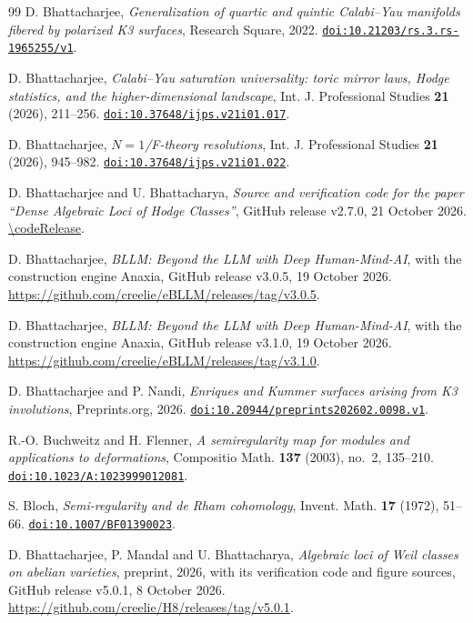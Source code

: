 \begin{thebibliography}{99}
D. Bhattacharjee,
\emph{Generalization of quartic and quintic Calabi--Yau manifolds fibered by polarized K3 surfaces},
Research Square, 2022.
\href{https://doi.org/10.21203/rs.3.rs-1965255/v1}{\nolinkurl{doi:10.21203/rs.3.rs-1965255/v1}}.

D. Bhattacharjee,
\emph{Calabi--Yau saturation universality: toric mirror laws, Hodge statistics, and the higher-dimensional landscape},
Int. J. Professional Studies \textbf{21} (2026), 211--256.
\href{https://doi.org/10.37648/ijps.v21i01.017}{\nolinkurl{doi:10.37648/ijps.v21i01.017}}.

D. Bhattacharjee,
\emph{$N=1$/F-theory resolutions},
Int. J. Professional Studies \textbf{21} (2026), 945--982.
\href{https://doi.org/10.37648/ijps.v21i01.022}{\nolinkurl{doi:10.37648/ijps.v21i01.022}}.

D. Bhattacharjee and U. Bhattacharya,
\emph{Source and verification code for the paper ``Dense Algebraic Loci of Hodge Classes''},
GitHub release v2.7.0, 21 October 2026.
\url{\codeRelease}.

D. Bhattacharjee,
\emph{BLLM: Beyond the LLM with Deep Human-Mind-AI}, with the construction engine Anaxia,
GitHub release v3.0.5, 19 October 2026.
\url{https://github.com/creelie/eBLLM/releases/tag/v3.0.5}.

D. Bhattacharjee,
\emph{BLLM: Beyond the LLM with Deep Human-Mind-AI}, with the construction engine Anaxia,
GitHub release v3.1.0, 19 October 2026.
\url{https://github.com/creelie/eBLLM/releases/tag/v3.1.0}.

D. Bhattacharjee and P. Nandi,
\emph{Enriques and Kummer surfaces arising from K3 involutions},
Preprints.org, 2026.
\href{https://doi.org/10.20944/preprints202602.0098.v1}{\nolinkurl{doi:10.20944/preprints202602.0098.v1}}.

R.-O. Buchweitz and H. Flenner,
\emph{A semiregularity map for modules and applications to deformations},
Compositio Math. \textbf{137} (2003), no.~2, 135--210.
\href{https://doi.org/10.1023/A:1023999012081}{\nolinkurl{doi:10.1023/A:1023999012081}}.

S. Bloch,
\emph{Semi-regularity and de Rham cohomology},
Invent. Math. \textbf{17} (1972), 51--66.
\href{https://doi.org/10.1007/BF01390023}{\nolinkurl{doi:10.1007/BF01390023}}.

D. Bhattacharjee, P. Mandal and U. Bhattacharya,
\emph{Algebraic loci of Weil classes on abelian varieties},
preprint, 2026, with its verification code and figure sources, GitHub release v5.0.1, 8 October 2026.
\url{https://github.com/creelie/H8/releases/tag/v5.0.1}.


\end{thebibliography}
